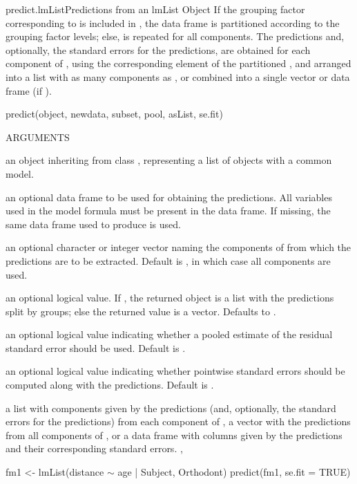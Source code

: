 \documentclass[pdftex]{article} \usepackage{url,graphicx}
\renewcommand{\Twiddle}{\mbox{\(\sim\)}}
\begin{document}
\begin{Helpfile}{predict.lmList}{Predictions from an lmList Object}
If the grouping factor corresponding to  is included
in , the data frame is partitioned according to the
grouping factor levels; else,  is repeated for all
 components. The predictions and, optionally, the standard
errors for the predictions, are obtained for each 
component of , using the corresponding element of the
partitioned , and arranged into a list with as many
components as , or combined into a single vector or data
frame (if ).
\begin{Example}
predict(object, newdata, subset, pool, asList, se.fit)
\end{Example}
\begin{Argument}{ARGUMENTS}
\item[\Co{object:}]
an object inheriting from class , representing
a list of  objects with a common model.
\item[\Co{newdata:}]
an optional data frame to be used for obtaining the
predictions. All variables used in the  model formula
must be present in the data frame. If missing, the same data frame
used to produce  is used.
\item[\Co{subset:}]
an optional character or integer vector naming the
 components of  from which the predictions
are to be extracted. Default is , in which case all
components are used.
\item[\Co{asList:}]
an optional logical value. If , the returned
object is a list with the predictions split by groups; else the
returned value is a vector. Defaults to .
\item[\Co{pool:}]
an optional logical value indicating whether a pooled
estimate of the residual standard error should be used. Default is
.
\item[\Co{se.fit:}]
an optional logical value indicating whether pointwise
standard errors should be computed along with the
predictions. Default is .
\end{Argument}
a list with components given by the predictions (and, optionally, the
standard errors for the predictions) from each 
component of ,  a vector with the predictions from all 
 components of , or a data frame with columns
given by the predictions and their corresponding standard errors.
, 
\need 15pt
\vspace{-16pt}
\begin{Example}
fm1 <- lmList(distance {\Twiddle} age | Subject, Orthodont)
predict(fm1, se.fit = TRUE)
\end{Example}
\end{Helpfile}
\end{document}
